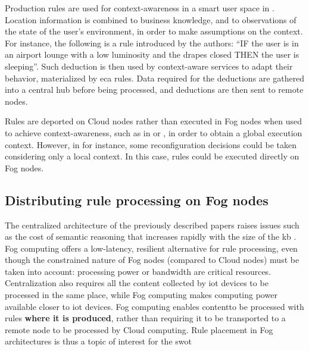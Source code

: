 \documentclass[sw]{iosart2x}
\begin{document}
Production rules are used for context-awareness in a smart user space in \cite{Hussein2016}.
Location information is combined to business knowledge, and to observations of the state of the user's environment, in order to make assumptions on the context.
For instance, the following is a rule introduced by the authors: ``IF the user is in an airport lounge with a low luminosity and the drapes closed THEN the user is sleeping''.
Such deduction is then used by context-aware services to adapt their behavior, materialized by \gls{eca} rules.
Data required for the deductions are gathered into a central hub before being processed, and deductions are then sent to remote nodes.

Rules are deported on Cloud nodes rather than executed in Fog nodes when used to achieve context-awareness, such as in \cite{Evchina2015} or \cite{Hussein2016}, in order to obtain a global execution context.
However, in \cite{Rodriguez2010} for instance, some reconfiguration decisions could be taken considering only a local context. 
In this case, rules could be executed directly on Fog nodes.

\subsection{Distributing rule processing on Fog nodes}

The centralized architecture of the previously described papers raises issues such as the cost of semantic reasoning that increases rapidly with the size of the \gls{kb} \cite{Maarala2017}.
Fog computing offers a low-latency, resilient alternative for rule processing, even though the constrained nature of Fog nodes (compared to Cloud nodes) must be taken into account: processing power or bandwidth are critical resources.
Centralization also requires all the content collected by \gls{iot} devices to be processed in the same place, while Fog computing makes computing power available closer to \gls{iot} devices.
Fog computing enables contentto be processed with rules \textbf{where it is produced}, rather than requiring it to be transported to a remote node to be processed by Cloud computing.
Rule placement in Fog architectures is thus a topic of interest for the \gls{swot}
\end{document}
